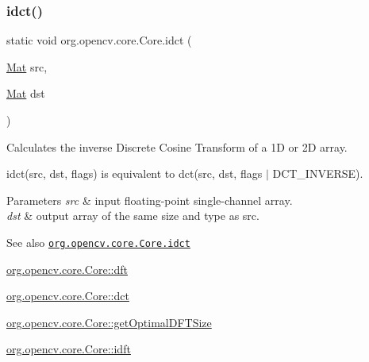 \subsubsection{\texorpdfstring{idct()}{idct()}\hspace{0.1cm}{\footnotesize\ttfamily [2/2]}}
{\footnotesize\ttfamily static void org.\+opencv.\+core.\+Core.\+idct (\begin{DoxyParamCaption}\item[{\mbox{\hyperlink{classorg_1_1opencv_1_1core_1_1_mat}{Mat}}}]{src,  }\item[{\mbox{\hyperlink{classorg_1_1opencv_1_1core_1_1_mat}{Mat}}}]{dst }\end{DoxyParamCaption})\hspace{0.3cm}{\ttfamily [static]}}

Calculates the inverse Discrete Cosine Transform of a 1D or 2D array.

{\ttfamily idct(src, dst, flags)} is equivalent to {\ttfamily dct(src, dst, flags $\vert$ D\+C\+T\+\_\+\+I\+N\+V\+E\+R\+SE)}.


\begin{DoxyParams}{Parameters}
{\em src} & input floating-\/point single-\/channel array. \\
\hline
{\em dst} & output array of the same size and type as {\ttfamily src}.\\
\hline
\end{DoxyParams}
\begin{DoxySeeAlso}{See also}
\href{http://docs.opencv.org/modules/core/doc/operations_on_arrays.html#idct}{\tt org.\+opencv.\+core.\+Core.\+idct} 

\mbox{\hyperlink{classorg_1_1opencv_1_1core_1_1_core_a43313221157a3008972a04727a65a58d}{org.\+opencv.\+core.\+Core\+::dft}} 

\mbox{\hyperlink{classorg_1_1opencv_1_1core_1_1_core_a1f0b3c28295d4db1ecd755201833d6cb}{org.\+opencv.\+core.\+Core\+::dct}} 

\mbox{\hyperlink{classorg_1_1opencv_1_1core_1_1_core_a9818ffe89dca479da8352d5bf6ebd6b3}{org.\+opencv.\+core.\+Core\+::get\+Optimal\+D\+F\+T\+Size}} 

\mbox{\hyperlink{classorg_1_1opencv_1_1core_1_1_core_a4fc0b0f22fef014f5e602e8d5b367a44}{org.\+opencv.\+core.\+Core\+::idft}} 
\end{DoxySeeAlso}
\mbox{\label{classorg_1_1opencv_1_1core_1_1_core_a4fc0b0f22fef014f5e602e8d5b367a44}} 
